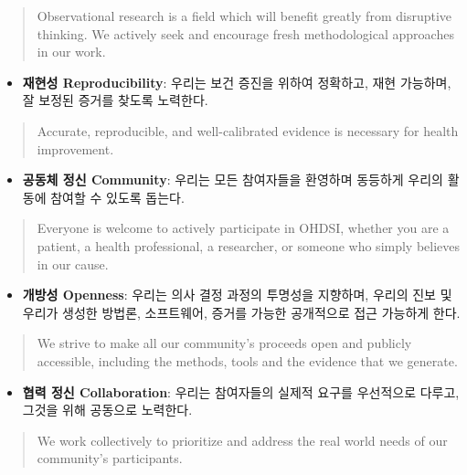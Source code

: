 \documentclass[]{book}
\providecommand{\tightlist}{%
  \setlength{\itemsep}{0pt}\setlength{\parskip}{0pt}}
\begin{document}
\begin{quote}
Observational research is a field which will benefit greatly from disruptive thinking. We actively seek and encourage fresh methodological approaches in our work.
\end{quote}

\begin{itemize}
\tightlist
\item
  \textbf{재현성 Reproducibility}: 우리는 보건 증진을 위하여 정확하고, 재현 가능하며, 잘 보정된 증거를 찾도록 노력한다.
\end{itemize}

\begin{quote}
Accurate, reproducible, and well-calibrated evidence is necessary for health improvement.
\end{quote}

\begin{itemize}
\tightlist
\item
  \textbf{공동체 정신 Community}: 우리는 모든 참여자들을 환영하며 동등하게 우리의 활동에 참여할 수 있도록 돕는다.
\end{itemize}

\begin{quote}
Everyone is welcome to actively participate in OHDSI, whether you are a patient, a health professional, a researcher, or someone who simply believes in our cause.
\end{quote}

\begin{itemize}
\tightlist
\item
  \textbf{개방성 Openness}: 우리는 의사 결정 과정의 투명성을 지향하며, 우리의 진보 및 우리가 생성한 방법론, 소프트웨어, 증거를 가능한 공개적으로 접근 가능하게 한다.
\end{itemize}

\begin{quote}
We strive to make all our community's proceeds open and publicly accessible, including the methods, tools and the evidence that we generate.
\end{quote}

\begin{itemize}
\tightlist
\item
  \textbf{협력 정신 Collaboration}: 우리는 참여자들의 실제적 요구를 우선적으로 다루고, 그것을 위해 공동으로 노력한다.
\end{itemize}

\begin{quote}
We work collectively to prioritize and address the real world needs of our community's participants.
\end{quote}
\end{document}
